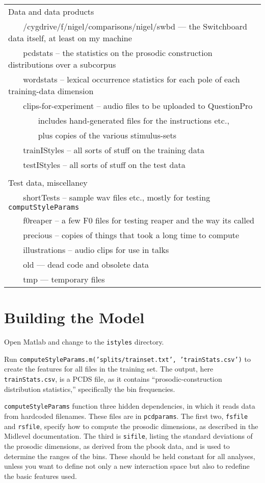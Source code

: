 \documentclass[11pt]{article}
\begin{document}
\begin{tabular}{l}
Data and data products \\
~~~ /cygdrive/f/nigel/comparisons/nigel/swbd --- the Switchboard data itself, at least on my machine\\ 
~~~ pcdstats -- the statistics on the prosodic construction distributions over a subcorpus \\
~~~ wordstats -- lexical occurrence statistics for each pole of each training-data dimension \\
~~~ clips-for-experiment -- audio files to be uploaded to QuestionPro  \\
~~~ ~~~ includes hand-generated files for the instructions etc., \\
~~~ ~~~ plus copies of the various stimulus-sets \\
~~~ trainIStyles -- all sorts of stuff on the training data  \\
~~~ testIStyles -- all sorts of  stuff on the test data  \\
\\
Test data, miscellaney \\
~~~ shortTests  -- sample wav files etc., mostly for testing {\tt computStyleParams} \\
~~~ f0reaper -- a few F0 files for testing reaper and the way its called \\
~~~ precious -- copies of things that took a long time to compute \\
~~~ illustrations -- audio clips for use in talks \\
~~~ old --- dead code and obsolete data \\
~~~ tmp --- temporary files 
\end{tabular}



\section{Building the Model}

Open Matlab and change to the {\tt istyles} directory.

Run {\tt computeStyleParams.m('splits/trainset.txt',
  'trainStats.csv')} to create the features for all files in the
training set.  The output, here {\tt trainStats.csv}, is
 a PCDS file, as it contains ``prosodic-construction distribution
statistics,'' specifically the bin frequencies.

{\tt computeStyleParams} function three hidden dependencies,
in which it reads data from hardcoded filenames.  These files are in
{\tt pcdparams}.  The first two, {\tt fsfile} and {\tt rsfile}, specify
how to compute the prosodic dimensions, as described in the Midlevel
documentation. The third is {\tt sifile}, listing the standard
deviations of the prosodic dimensions, as derived from the pbook data,
and is used to determine the ranges of the bins.  These should be held
constant for all analyses, unless you want to define not only a new
interaction space but also to redefine the basic features used.
\end{document}
